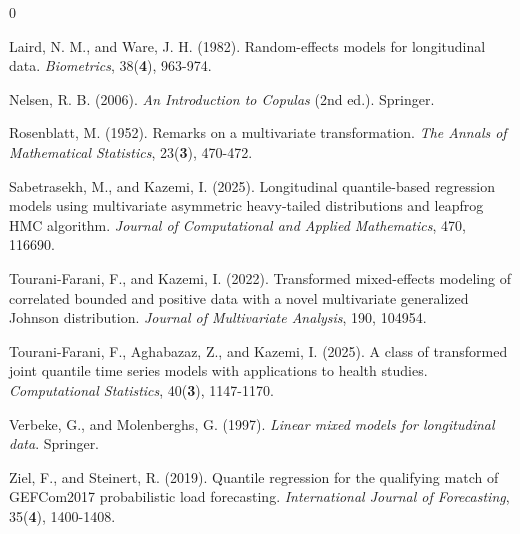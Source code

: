 \documentclass[twoside]{article}
\begin{document}
\begin{thebibliography}{0}
	
	 Laird, N. M., and Ware, J. H. (1982). Random-effects models for longitudinal data. \textit{Biometrics}, 38(\textbf{4}), 963-974.
	
	 Nelsen, R. B. (2006). \textit{An Introduction to Copulas} (2nd ed.). Springer.
	
	 Rosenblatt, M. (1952). Remarks on a multivariate transformation. \textit{The Annals of Mathematical Statistics}, 23(\textbf{3}), 470-472.
	
	 Sabetrasekh, M., and Kazemi, I. (2025). Longitudinal quantile-based regression models using multivariate asymmetric heavy-tailed distributions and leapfrog HMC algorithm. \textit{Journal of Computational and Applied Mathematics}, 470, 116690.
	
	
	 Tourani-Farani, F., and Kazemi, I. (2022). Transformed mixed-effects modeling of correlated bounded and positive data with a novel multivariate generalized Johnson distribution. \textit{Journal of Multivariate Analysis}, 190, 104954.
	
	 Tourani-Farani, F., Aghabazaz, Z., and Kazemi, I. (2025). A class of transformed joint quantile time series models with applications to health studies. \textit{Computational Statistics}, 40(\textbf{3}), 1147-1170.
	
	 Verbeke, G., and Molenberghs, G. (1997). \textit{Linear mixed models for longitudinal data}. Springer.
	
	 Ziel, F., and Steinert, R. (2019). Quantile regression for the qualifying match of GEFCom2017 probabilistic load forecasting. \textit{International Journal of Forecasting}, 35(\textbf{4}), 1400-1408.
	
	
\end{thebibliography}
 
\end{document}
